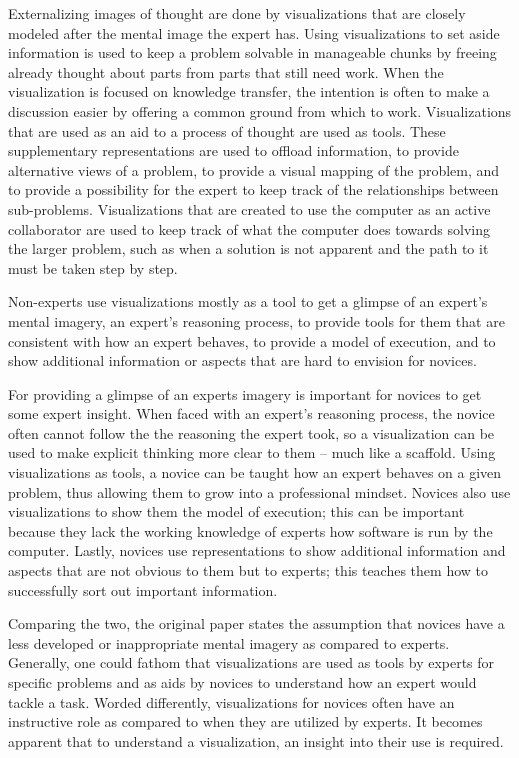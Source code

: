 \documentclass[11pt, a4paper, ngerman, twoside]{article}
\theoremstyle{plain}\newtheorem{Lemma}{Lemma}
\theoremstyle{plain}\newtheorem{Satz}[Lemma]{Satz}
\theoremstyle{definition}\newtheorem{Definition}[Lemma]{Definition}
\theoremstyle{definition}\newtheorem*{Beispiel}{Beispiel}
\theoremstyle{remark}\newtheorem*{Bemerkung}{Bemerkung}
\begin{document}
Externalizing images of thought are done by visualizations that are closely modeled after the mental image the expert has. Using visualizations to set aside information is used to keep a problem solvable in manageable chunks by freeing already thought about parts from parts that still need work. When the visualization is focused on knowledge transfer, the intention is often to make a discussion easier by offering a common ground from which to work. Visualizations that are used as an aid to a process of thought are used as tools. These supplementary representations are used to offload information, to provide alternative views of a problem, to provide a visual mapping of the problem, and to provide a possibility for the expert to keep track of the relationships between sub-problems. Visualizations that are created to use the computer as an active collaborator are used to keep track of what the computer does towards solving the larger problem, such as when a solution is not apparent and the path to it must be taken step by step.

Non-experts use visualizations mostly as a tool to get a glimpse of an expert's mental imagery, an expert's reasoning process, to provide tools for them that are consistent with how an expert behaves, to provide a model of execution, and to show additional information or aspects that are hard to envision for novices.

For providing a glimpse of an experts imagery is important for novices to get some expert insight. When faced with an expert's reasoning process, the novice often cannot follow the the reasoning the expert took, so a visualization can be used to make explicit thinking more clear to them – much like a scaffold. Using visualizations as tools, a novice can be taught how an expert behaves on a given problem, thus allowing them to grow into a professional mindset. Novices also use visualizations to show them the model of execution; this can be important because they lack the working knowledge of experts how software is run by the computer. Lastly, novices use representations to show additional information and aspects that are not obvious to them but to experts; this teaches them how to successfully sort out important information.

Comparing the two, the original paper states the assumption that novices have a less developed or inappropriate mental imagery as compared to experts. Generally, one could fathom that visualizations are used as tools by experts for specific problems and as aids by novices to understand how an expert would tackle a task. Worded differently, visualizations for novices often have an instructive role as compared to when they are utilized by experts. It becomes apparent that to understand a visualization, an insight into their use is required.
\end{document}
